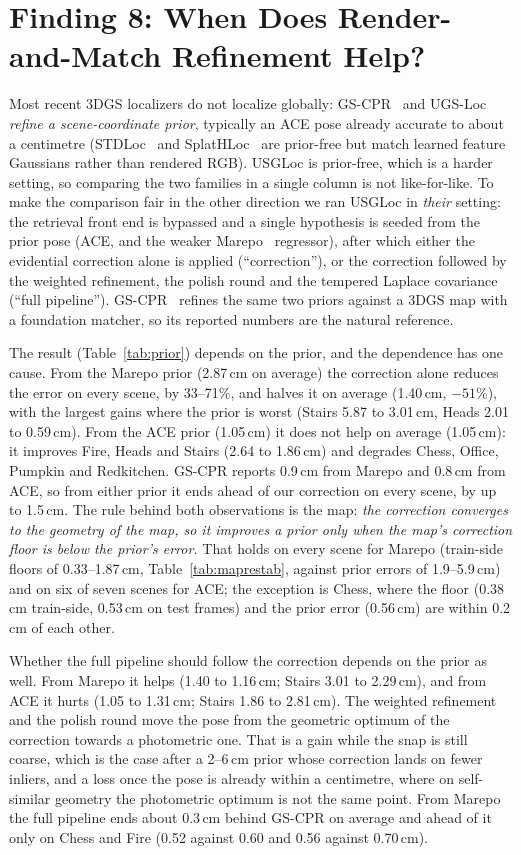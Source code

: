 \documentclass[journal]{IEEEtran}
\newcommand{\method}{USGLoc}
\begin{document}
\section{Finding 8: When Does Render-and-Match Refinement Help?}
\label{sec:prior}
Most recent 3DGS localizers do not localize globally: GS-CPR~\cite{gscpr} and UGS-Loc~\cite{ugsloc} \emph{refine a scene-coordinate prior}, typically an ACE pose already accurate to about a centimetre (STDLoc~\cite{stdloc} and SplatHLoc~\cite{splathloc} are prior-free but match learned feature Gaussians rather than rendered RGB). \method{} is prior-free, which is a harder
setting, so comparing the two families in a single column is not
like-for-like. To make the comparison fair in the other direction we ran
\method{} in \emph{their} setting: the retrieval front end is bypassed and a
single hypothesis is seeded from the prior pose (ACE, and the weaker Marepo~\cite{marepo} regressor), after which either the evidential correction alone is applied (``correction''), or the correction followed by the weighted refinement, the polish round and the tempered Laplace covariance (``full pipeline''). GS-CPR~\cite{gscpr} refines the same two priors against a 3DGS map with a foundation matcher, so its reported numbers are the natural reference.

The result (Table~\ref{tab:prior}) depends on the prior, and the dependence
has one cause. From the Marepo prior (2.87\,cm on average) the correction alone reduces the error on every scene, by 33--71\%, and halves it on average (1.40\,cm, $-51\%$), with
the largest gains where the prior is worst (Stairs 5.87 to 3.01\,cm, Heads
2.01 to 0.59\,cm). From the ACE prior (1.05\,cm) it does not help on average
(1.05\,cm): it improves Fire, Heads and Stairs (2.64 to 1.86\,cm) and degrades
Chess, Office, Pumpkin and Redkitchen. GS-CPR reports 0.9\,cm from Marepo and
0.8\,cm from ACE, so from either prior it ends ahead of our correction on every scene, by up to 1.5\,cm. The rule behind both observations is the map:
\emph{the correction converges to the geometry of the map, so it improves a
prior only when the map's correction floor is below the prior's error.} That
holds on every scene for Marepo (train-side floors of 0.33--1.87\,cm,
Table~\ref{tab:maprestab}, against prior errors of 1.9--5.9\,cm) and on six of
seven scenes for ACE; the exception is Chess, where the floor (0.38\,cm
train-side, 0.53\,cm on test frames) and the prior error (0.56\,cm) are within
0.2\,cm of each other.

Whether the full pipeline should follow the correction depends on the
prior as well. From Marepo it helps (1.40 to 1.16\,cm; Stairs 3.01 to
2.29\,cm), and from ACE it hurts (1.05 to 1.31\,cm; Stairs 1.86 to 2.81\,cm).
The weighted refinement and the polish round move the pose from the
geometric optimum of the correction towards a photometric one. That is a
gain while the snap is still coarse, which is the case after a 2--6\,cm prior
whose correction lands on fewer inliers, and a loss once the pose is already
within a centimetre, where on self-similar geometry the photometric optimum
is not the same point. From Marepo the full pipeline ends about 0.3\,cm behind GS-CPR on average and ahead of it only on Chess and Fire (0.52 against 0.60 and 0.56 against 0.70\,cm).
\end{document}
